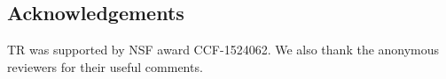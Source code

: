 \subsection*{Acknowledgements}\label{ack}
TR was supported by NSF award CCF-1524062. We also thank the anonymous reviewers for their useful comments.